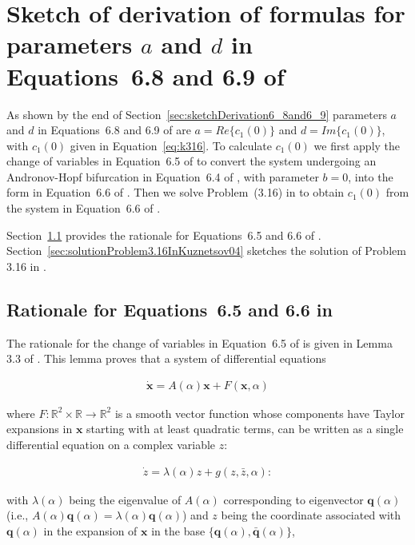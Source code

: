 \documentclass{article}
\theoremstyle{lemma}
\begin{document}
\section{Sketch of derivation of formulas for parameters $a$ and $d$ in
Equations~6.8 and 6.9 of \citet{izhikevich07}}
\label{sec:sketchDerivationFormulaParametersAandD}

As shown by the end of Section~\ref{sec:sketchDerivation6_8and6_9} parameters
$a$ and $d$ in Equations~6.8 and 6.9 of \citet{izhikevich07} are
$a=Re\{c_1(0)\}$ and $d=Im\{c_1(0)\}$, with $c_1(0)$ given in
Equation~\ref{eq:k316}. To calculate $c_1(0)$ we first apply the change
of variables in Equation~6.5 of \citet{izhikevich07} to convert the system
undergoing an Andronov-Hopf bifurcation in Equation~6.4 of
\citet{izhikevich07}, with parameter $b=0$, into the form in Equation~6.6 of
\citet{izhikevich07}. Then we solve Problem~(3.16) in \citet{kuznetsov04} to
obtain $c_1(0)$ from the system in Equation~6.6 of \citet{izhikevich07}.

Section~\ref{sec:rationaleEqs6_5And6_6} provides the rationale for
Equations~6.5 and 6.6 of \citet{izhikevich07}.
Section~\ref{sec:solutionProblem3.16InKuznetsov04} sketches the solution of
Problem 3.16 in \citet{kuznetsov04}.

\subsection{Rationale for Equations~6.5 and 6.6 in
\citet{izhikevich07}}
\label{sec:rationaleEqs6_5And6_6}

The rationale for the change of variables in Equation~6.5 of
\citet{izhikevich07} is given in Lemma 3.3 of \citet{kuznetsov04}. This lemma
proves that a system of differential equations

\begin{align}
\mathbf{\dot{x}}=A(\alpha)\mathbf{x}+F(\mathbf{x},\alpha)\nonumber
\end{align}

\noindent where $F:\mathbb{R}^2\times\mathbb{R}\rightarrow\mathbb{R}^2$ is a
smooth vector function whose components have Taylor expansions in $\mathbf{x}$
starting with at least quadratic terms, can be written as a single
differential equation on a complex variable $z$:

\begin{align}
\dot{z}=\lambda(\alpha)z+g(z,\bar{z},\alpha)
\label{eq:zDotKusnetzov}:
\end{align}

\noindent with $\lambda(\alpha)$ being the eigenvalue of $A(\alpha)$
corresponding to eigenvector $\mathbf{q}(\alpha)$ (i.e.,
$A(\alpha)\mathbf{q}(\alpha)=\lambda(\alpha)\mathbf{q}(\alpha)$) and $z$ being
the coordinate associated with $\mathbf{q}(\alpha)$ in the expansion of
$\mathbf{x}$ in the base $\{\mathbf{q}(\alpha),\mathbf{\bar{q}}(\alpha)\}$,
\end{document}
